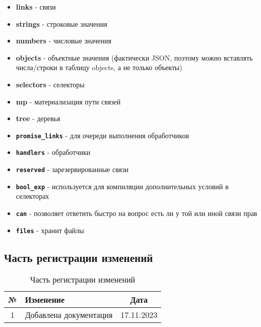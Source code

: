 \documentclass{article}
\begin{document}
\begin{itemize}
  \item \textbf{links} - связи
  \item \textbf{strings} - строковые значения
  \item \textbf{numbers} - числовые значения
  \item \textbf{objects} - объектные значения (фактически JSON, поэтому можно
        вставлять числа/строки в таблицу objects, а не только объекты)
  \item \textbf{selectors} - селекторы
  \item \textbf{mp} - материализация пути связей
  \item \textbf{tree} - деревья
  \item \textbf{\texttt{promise\_links}} - для очереди выполнения обработчиков
  \item \textbf{\texttt{handlers}} - обработчики
  \item \textbf{\texttt{reserved}} - зарезервированные связи
  \item \textbf{\texttt{bool\_exp}} - используется для компиляции
        дополнительных условий в селекторах
  \item \textbf{\texttt{can}} - позволяет ответить быстро на вопрос есть ли у
        той или иной связи прав
  \item \textbf{\texttt{files}} - хранит файлы
\end{itemize}

\subsection{Часть регистрации изменений}

\begin{table}[h]
  \centering
  \caption{Часть регистрации изменений}
  \begin{tabular}{|c|p{8cm}|c|}
    \hline
    \textbf{№} & \textbf{Изменение}     & \textbf{Дата} \\
    \hline
    1          & Добавлена документация & 17.11.2023    \\
    \hline
  \end{tabular}
\end{table}
\end{document}
